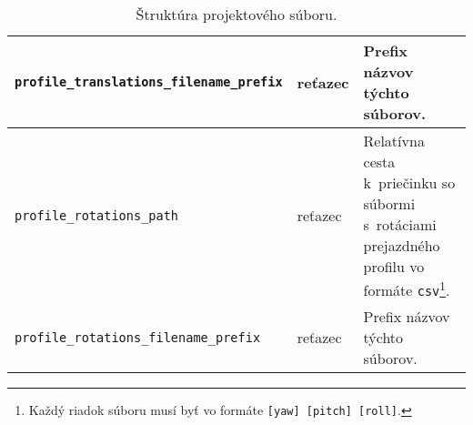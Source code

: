 \begin{sidewaystable}
\begin{tabular}{>{}p{20em}|>{}p{8em}|>{}p{28em}}
        \texttt{profile\_translations\_filename\_prefix} & reťazec & Prefix názvov týchto súborov. \\ \hline
        \texttt{profile\_rotations\_path} & reťazec & Relatívna cesta k~priečinku so súbormi s~rotáciami prejazdného profilu vo formáte \texttt{csv}\footnote{Každý riadok súboru musí byť vo formáte \texttt{[yaw] [pitch] [roll]}.}. \\ \hline
        \texttt{profile\_rotations\_filename\_prefix} & reťazec & Prefix názvov týchto súborov. \\
    \end{tabular}
    \caption{Štruktúra projektového súboru.}
    \label{tab:projektovy_subor}
\end{sidewaystable}



%
